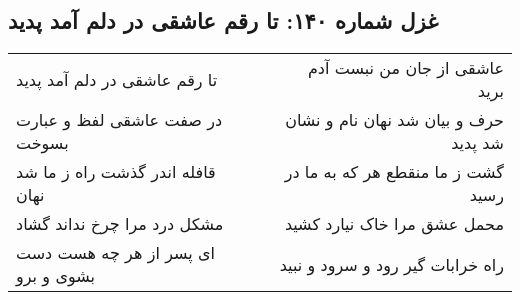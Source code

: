 \begin{center}
\section*{غزل شماره ۱۴۰: تا رقم عاشقی در دلم آمد پدید}
\label{sec:140}
\begin{longtable}{l p{0.5cm} r}
تا رقم عاشقی در دلم آمد پدید
&&
عاشقی از جان من نبست آدم برید
\\
در صفت عاشقی لفظ و عبارت بسوخت
&&
حرف و بیان شد نهان نام و نشان شد پدید
\\
قافله اندر گذشت راه ز ما شد نهان
&&
گشت ز ما منقطع هر که به ما در رسید
\\
مشکل درد مرا چرخ نداند گشاد
&&
محمل عشق مرا خاک نیارد کشید
\\
ای پسر از هر چه هست دست بشوی و برو
&&
راه خرابات گیر رود و سرود و نبید
\\
\end{longtable}
\end{center}
